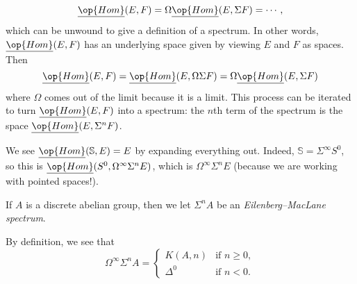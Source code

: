 \documentclass[../notes.tex]{subfiles}
\begin{document}
\[\underline{\op{Hom}}(E,F)=\Omega\underline{\op{Hom}}(E,\Sigma F)=\cdots,\]
which can be unwound to give a definition of a spectrum. In other words, $\underline{\op{Hom}}(E,F)$ has an underlying space given by viewing $E$ and $F$ as spaces. Then
\[\underline{\op{Hom}}(E,F)=\underline{\op{Hom}}(E,\Omega\Sigma F)=\Omega\underline{\op{Hom}}(E,\Sigma F)\]
where $\Omega$ comes out of the limit because it is a limit. This process can be iterated to turn $\underline{\op{Hom}}(E,F)$ into a spectrum: the $n$th term of the spectrum is the space $\underline{\op{Hom}}(E,\Sigma^nF)$.
\begin{example}
	We see $\underline{\op{Hom}}(\mathbb S,E)=E$ by expanding everything out. Indeed, $\mathbb S=\Sigma^\infty S^0$, so this is $\underline{\op{Hom}}(S^0,\Omega^\infty\Sigma^nE)$, which is $\Omega^\infty\Sigma^nE$ (because we are working with pointed spaces!).
\end{example}
\begin{definition}
	If $A$ is a discrete abelian group, then we let $\Sigma^nA$ be an \textit{Eilenberg--MacLane spectrum}.
\end{definition}
\begin{example}
	By definition, we see that
	\[\Omega^\infty\Sigma^nA=\begin{cases}
		K(A,n) & \text{if }n\ge0, \\
		\Delta^0 & \text{if }n<0.
	\end{cases}\]
\end{example}
\end{document}
